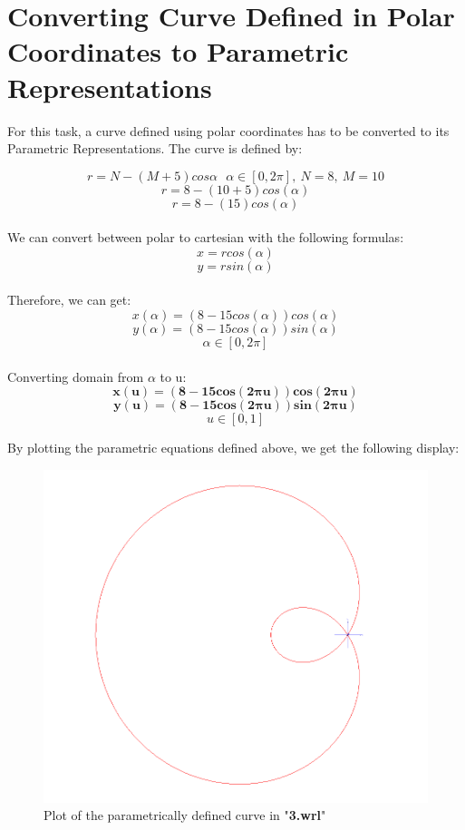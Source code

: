 \documentclass[acmlarge,nonacm=true]{acmart}
\begin{document}
\section{Converting Curve Defined in Polar Coordinates to Parametric Representations}
For this task, a curve defined using polar coordinates has to be converted to its Parametric Representations. 
The curve is defined by:


\begin{displaymath}
	r = N - (M+5) cos \alpha \ \ \ \alpha \in [0, 2\pi],\ N = 8,\ M = 10
\end{displaymath}
\begin{displaymath}
	r = 8 - (10 + 5) cos(\alpha)
\end{displaymath}
\begin{displaymath}
	r = 8 - (15) cos(\alpha)
\end{displaymath}
\\We can convert between polar to cartesian with the following formulas:
\begin{displaymath}
	x = rcos(\alpha)
\end{displaymath}
\begin{displaymath}
	y = rsin(\alpha)
\end{displaymath}
\\Therefore, we can get:
\begin{displaymath}
	x(\alpha) =  (8 - 15cos(\alpha))cos(\alpha)
\end{displaymath}
\begin{displaymath}
	y(\alpha) =  (8 - 15cos(\alpha))sin(\alpha)
\end{displaymath}
\begin{displaymath}
	\alpha \in [0, 2\pi]
\end{displaymath}
\\Converting domain from \(\alpha\) to u:
\begin{displaymath}
	\mathbf{x(u) =  (8 - 15cos(2\pi u))cos(2\pi u)}
\end{displaymath}
\begin{displaymath}
	\mathbf{y(u) =  (8 - 15cos(2\pi u))sin(2\pi u)}
\end{displaymath}
\begin{displaymath}
	u \in [0, 1]
\end{displaymath}

By plotting the parametric equations defined above, we get the following display:
\begin{figure}[H]
	\centering
	\includegraphics[width=.5\linewidth]{fig/3}
	\caption{Plot of the parametrically defined curve in "\textbf{3.wrl}"}
	\label{fig:3}
\end{figure}
\end{document}
